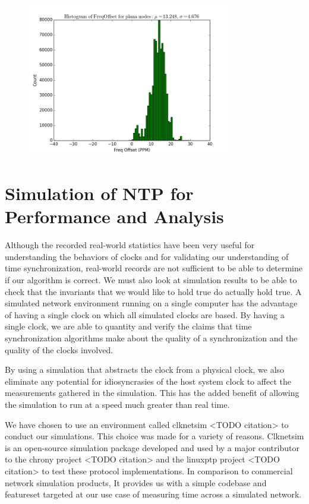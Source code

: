 \begin{figure}[h]
  \centering
  \includegraphics[width=0.8\textwidth]{plana-freq-offset.png}
\end{figure}

\section{Simulation of NTP for Performance and Analysis}

Although the recorded real-world statistics have been very useful for
understanding the behaviors of clocks and for validating our
understanding of time synchronization, real-world records are not
sufficient to be able to determine if our algorithm is correct. We
must also look at simulation results to be able to check that the
invariants that we would like to hold true do actually hold true. A
simulated network environment running on a single computer has the
advantage of having a single clock on which all simulated clocks are
based. By having a single clock, we are able to quantity and verify
the claims that time synchronization algorithms make about the quality
of a synchronization and the quality of the clocks involved.

By using a simulation that abstracts the clock from a physical clock,
we also eliminate any potential for idiosyncrasies of the host system
clock to affect the measurements gathered in the simulation. This has
the added benefit of allowing the simulation to run at a speed much
greater than real time.

We have chosen to use an environment called clknetsim <TODO citation> to
conduct our simulations. This choice was made for a variety of
reasons. Clknetsim is an open-source simulation package developed and
used by a major contributor to the chrony project <TODO citation> and the
linuxptp project <TODO citation> to test these protocol implementations. In
comparison to commercial network simulation products, It provides us
with a simple codebase and featureset targeted at our use case of
measuring time across a simulated network.

